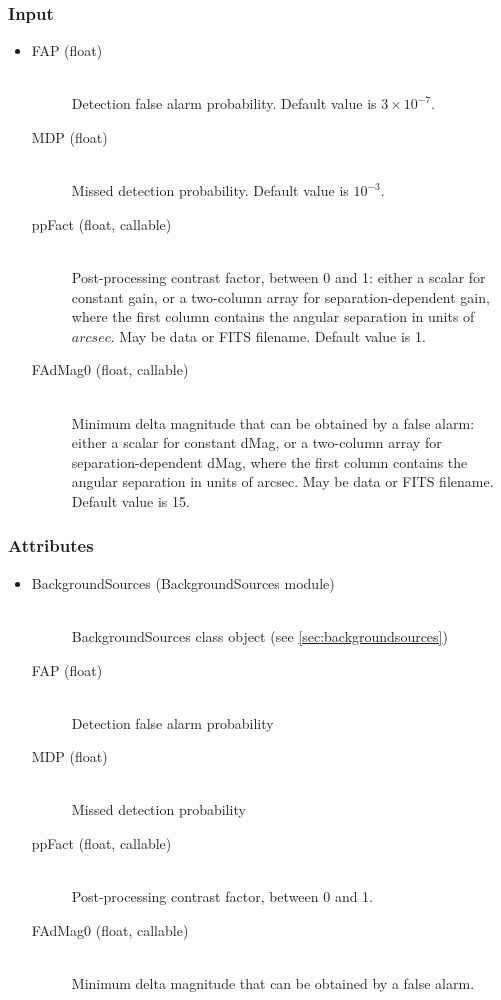\documentclass[cleanfoot]{asme2ej}
\begin{document}
\subsubsection*{Input}
\begin{itemize}
\item 
\begin{description}
    \item[FAP (float)] \hfill \\ Detection false alarm probability. Default value is $3 \times 10^{-7}$.
    \item[MDP (float)] \hfill \\ Missed detection probability. Default value is $10^{-3}$.
    \item[ppFact (float, callable)] \hfill \\ Post-processing contrast factor, between 0 and 1: either a scalar for constant gain, or a two-column array for separation-dependent gain, where the first column contains the angular separation in units of $arcsec$. May be data or FITS filename. Default value is 1.
    \item[FAdMag0 (float, callable)] \hfill \\ Minimum delta magnitude that can be obtained by a false alarm: either a scalar for constant dMag, or a two-column array for separation-dependent dMag, where the first column contains the angular separation in units of arcsec. May be data or FITS filename. Default value is 15.
\end{description}
\end{itemize}

\subsubsection*{Attributes}
\begin{itemize}
\item 
\begin{description}
    \item[BackgroundSources (BackgroundSources module)] \hfill \\
        BackgroundSources class object (see \ref{sec:backgroundsources})
    \item[FAP (float)] \hfill \\ Detection false alarm probability
    \item[MDP (float)] \hfill \\ Missed detection probability
    \item[ppFact (float, callable)] \hfill \\ Post-processing contrast factor, between 0 and 1.
    \item[FAdMag0 (float, callable)] \hfill \\ Minimum delta magnitude that can be obtained by a false alarm.
\end{description}
\end{itemize}
\end{document}
